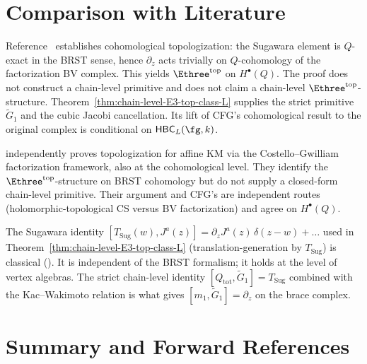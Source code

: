 \section{Comparison with Literature}
\label{sec:comparison-literature}

\begin{remark}
\label{rem:CFG}
Reference~\cite{CFG2602} establishes cohomological topologization:
the Sugawara element is $Q$-exact in the BRST sense, hence
$\partial_z$ acts trivially on $Q$-cohomology of the factorization
BV complex. This yields $\Ethree^{\mathrm{top}}$ on $H^\bullet(Q)$.
The proof does not construct a chain-level primitive and does not
claim a chain-level $\Ethree^{\mathrm{top}}$-structure.
Theorem~\ref{thm:chain-level-E3-top-class-L} supplies the
strict primitive $\widetilde G_1$ and the cubic Jacobi
cancellation. Its lift of CFG's cohomological result to the
original complex is conditional on $\mathsf{HBC}_L(\fg,k)$.
\end{remark}

\begin{remark}
\label{rem:KhanZeng}
\cite{KhanZeng25} independently proves topologization for
affine KM via the Costello--Gwilliam factorization framework,
also at the cohomological level. They identify the
$\Ethree^{\mathrm{top}}$-structure on BRST cohomology but do not
supply a closed-form chain-level primitive. Their argument and
CFG's are independent routes (holomorphic-topological CS versus
BV factorization) and agree on $H^\bullet(Q)$.
\end{remark}

\begin{remark}
\label{rem:KW}
The Sugawara identity
$[T_{\mathrm{Sug}}(w), J^a(z)]
= \partial_z J^a(z)\,\delta(z-w) + \ldots$
used in Theorem~\ref{thm:chain-level-E3-top-class-L}
(translation-generation by $T_{\mathrm{Sug}}$) is classical
(\cite{KacWakimoto88}). It is independent of the BRST
formalism; it holds at the level of vertex algebras. The strict
chain-level identity
$[Q_{\mathrm{tot}}, \widetilde G_1] = T_{\mathrm{Sug}}$
combined with the Kac--Wakimoto relation is what gives
$[m_1, \widetilde G_1] = \partial_z$ on the brace complex.
\end{remark}

\section{Summary and Forward References}
\label{sec:summary-forward-refs}

